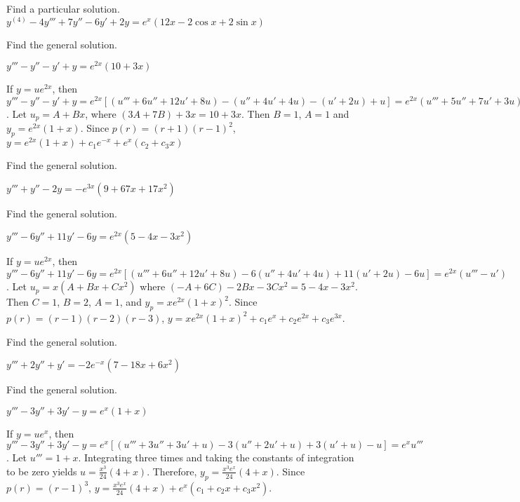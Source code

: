 \documentclass{ximera}
\begin{document}
\begin{problem}\label{exer:9.3.59}   Find a particular solution.   $y^{(4)}-4y'''+7y''-6y'+2y=e^x(12x-2\cos
x+2\sin x)$
\end{problem}

\begin{problem}\label{exer:9.3.60}   Find the general solution.

$y'''-y''-y'+y=e^{2x}(10+3x)$

\begin{solution}
If $y=ue^{2x}$, then $y'''-y''-y'+y=e^{2x}[
(u'''+6u''+12u'+8u) -(u''+4u'+4u) -(u'+2u) +u]
=e^{2x}(u'''+5u''+7u'+3u)$. Let $u_p=A+Bx$, where
$(3A+7B)+3x=10+3x$. Then $B=1$,
 $A=1$ and $y_p=e^{2x}(1+x)$. Since $p(r)=(r+1)(r-1)^2$,
 $y=e^{2x}(1+x)+c_1e^{-x}+e^x(c_2+c_3x)$
\end{solution}
\end{problem}

\begin{problem}\label{exer:9.3.61}   Find the general solution. 

$y'''+y''-2y=-e^{3x}(9+67x+17x^2)$
\end{problem}

\begin{problem}\label{exer:9.3.62}   Find the general solution.

$y'''-6y''+11y'-6y=e^{2x}(5-4x-3x^2)$

\begin{solution}
If $y=ue^{2x}$, then $y'''-6y''+11y'-6y=e^{2x}[
(u'''+6u''+12u'+8u) -6(u''+4u'+4u) +11(u'+2u) -6u]
=e^{2x}(u'''-u')$. Let $u_p=x(A+Bx+Cx^2)$ where
$(-A+6C)-2Bx-3Cx^2=5-4x-3x^2$. Then $C=1$, $B=2$,
 $A=1$, and $y_p=xe^{2x}(1+x)^2$.
 Since $p(r)=(r-1)(r-2)(r-3)$,
 $y=xe^{2x}(1+x)^2+c_1e^x+c_2e^{2x}+c_3e^{3x}$.

\end{solution}
\end{problem}

\begin{problem}\label{exer:9.3.63}   Find the general solution. 

$y'''+2y''+y'=-2e^{-x}(7-18x+6x^2)$
\end{problem}

\begin{problem}\label{exer:9.3.64}   Find the general solution. 

$y'''-3y''+3y'-y=e^x(1+x)$

\begin{solution}
If $y=ue^x$, then $y'''-3y''+3y'-y=e^x[
(u'''+3u''+3u'+u) -3(u''+2u'+u) +3(u'+u) -u]
=e^xu'''$. Let $u'''=1+x$. Integrating three times and taking
the constants of integration to be zero yields
$u=\frac{x^3}{24}(4+x)$. Therefore,
 $y_p=\frac{x^3e^x}{24}(4+x)$.
 Since $p(r)=(r-1)^3$,
 $y=\frac{x^3e^x}{24}(4+x)
+e^x(c_1+c_2x+c_3x^2)$.
\end{solution}
\end{problem}
\end{document}
